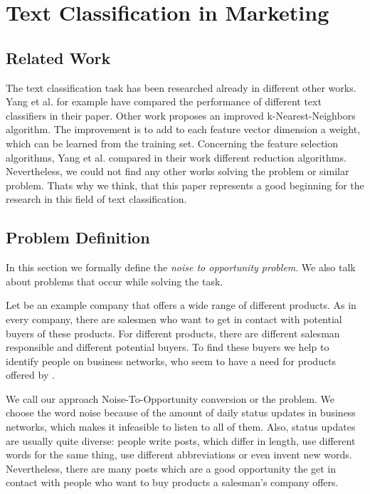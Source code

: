 
\section{Text Classification in Marketing}
\label{sec:background}

\subsection{Related Work}
The text classification task has been researched already in different other works.
Yang et al. for example have compared the performance of different text classifiers in their paper\cite{yang1999re}.
Other work\cite{han2001text} proposes an improved k-Nearest-Neighbors algorithm.
The improvement is to add to each feature vector dimension a weight, which can be learned from the training set.
Concerning the feature selection algorithms, Yang et al. compared in their work\cite{yang1997comparative} different reduction algorithms.
Nevertheless, we could not find any other works solving the \nto problem or similar problem.
Thats why we think, that this paper represents a good beginning for the research in this field of text classification.


\subsection{Problem Definition}
\label{sec:background-problem}

In this section we formally define the \emph{noise to opportunity problem}.
We also talk about problems that occur while solving the task.

Let \acme be an example company that offers a wide range of different products.
As in every company, there are salesmen who want to get in contact with potential buyers of these products.
For different products, there are different salesman responsible and different potential buyers.
To find these buyers we help \acme to identify people on business networks, who seem to have a need for products offered by \acme.

We call our approach Noise-To-Opportunity conversion or the \nto problem.
We choose the word noise because of the amount of daily status updates in business networks, which makes it infeasible to listen to all of them.
Also, status updates are usually quite diverse: people write posts, which differ in length, use different words for the same thing, use  different abbreviations or even invent new words.
Nevertheless, there are many posts which are a good opportunity the get in contact with people who want to buy products a salesman's company offers.

